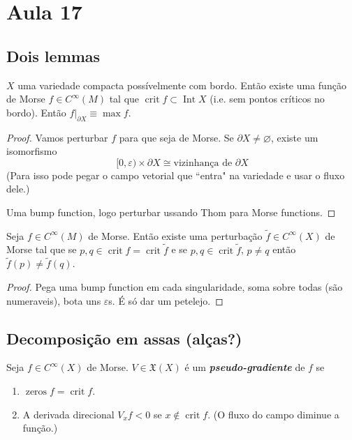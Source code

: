 \section{Aula 17}

\subsection{Dois lemmas}

\begin{lemma}\leavevmode
\(X\) uma variedade compacta possívelmente com bordo. Então existe uma função de Morse \(f \in C^\infty(M)\) tal que \(\operatorname{crit}f \subset \operatorname{Int}X\) (i.e. sem pontos críticos no bordo). Então \(f|_{\partial X}\equiv \operatorname{max}f\).
\end{lemma}

\begin{proof}\leavevmode
Vamos perturbar \(f\) para que seja de Morse. Se \(\partial X \neq \varnothing\), existe um isomorfismo
\[[0,\varepsilon) \times\partial X \cong \text{vizinhança de \(\partial X\)} \]
(Para isso pode pegar o campo vetorial que ``entra" na variedade e usar o fluxo dele.)


Uma bump function, logo perturbar ussando Thom para Morse functions.
\end{proof}

\begin{lemma}\leavevmode
Seja \(f \in C^\infty (M)\) de Morse. Então existe uma perturbação \(\tilde{f}\in C^\infty(X)\) de Morse tal que se \(p,q \in \operatorname{crit}f = \operatorname{crit}\tilde{f}\) e se \( p, q \in \operatorname{crit}\tilde{f}\), \(p \neq  q\) então \(\tilde{f}(p) \neq  \tilde{f}(q)\).
\end{lemma}

\begin{proof}\leavevmode
Pega uma bump function em cada singularidade, soma sobre todas (são numeraveis), bota uns \(\varepsilon\)s. É só dar um petelejo.
\end{proof}

\subsection{Decomposição em assas (alças?)}

\begin{defn}\leavevmode
Seja \(f \in C^\infty(X)\) de Morse. \(V \in \mathfrak{X}(X)\) é um \textit{\textbf{pseudo-gradiente}} de \(f\) se 
\begin{enumerate}
\item \(\operatorname{ze r o s}f= \operatorname{crit}f\).
\item A derivada direcional \(V_xf<0\) se  \(x \not \in \operatorname{crit}f\). (O fluxo do campo diminue a função.)
\end{enumerate}
\end{defn}


